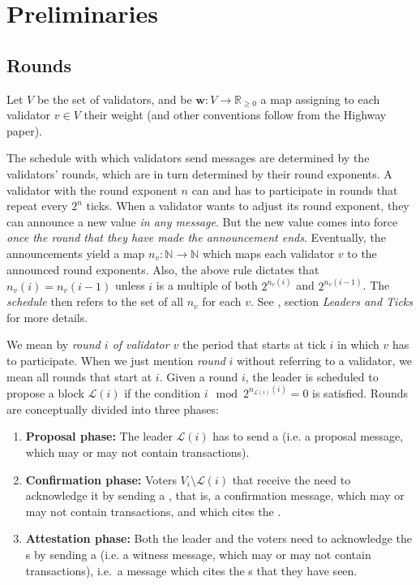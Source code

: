\section{Preliminaries}

\subsection{Rounds}
\label{sec:schedule}

Let $V$ be the set of validators, and be $\boldsymbol{w}:V\to \mathbb{R}_{\geq 0}$ a map assigning to each validator $v\in V$ their weight (and other conventions follow from the Highway paper).

The schedule with which validators send messages are determined by the validators' rounds, which are in turn determined by their round exponents. A validator with the round exponent $n$ can and has to participate in rounds that repeat every $2^n$ ticks. When a validator wants to adjust its round exponent, they can announce a new value \emph{in any message}. But the new value comes into force \emph{once the round that they have made the announcement ends}. Eventually, the announcements yield a map $n_v: \mathbb{N}\to \mathbb{N}$ which maps each validator $v$ to the announced round exponents. Also, the above rule dictates that $n_v(i)=n_v(i-1)$ unless $i$ is a multiple of both $2^{n_v(i)}$ and $2^{n_v(i-1)}$. The \emph{schedule} then refers to the set of all $n_v$ for each $v$. See \cite{kane2019casperlabs}, section \emph{Leaders and Ticks} for more details.

We mean by \emph{round $i$ of validator $v$} the period that starts at tick $i$ in which $v$ has to participate. When we just mention \emph{round} $i$ without referring to a validator, we mean all rounds that start at $i$. Given a round $i$, the leader is scheduled to propose a block $\mathcal{L}(i)$ if the condition $i\mod 2^{n_{\mathcal{L}(i)}(i)}=0$ is satisfied. Rounds are conceptually divided into three phases:

\begin{enumerate}
\item \textbf{Proposal phase:}
  The leader $\mathcal{L}(i)$ has to send a \PROP{} (i.e. a proposal message, which may or may not contain transactions).
\item \textbf{Confirmation phase:}
  Voters $V_i\setminus \mathcal{L}(i)$ that receive the \PROP need to acknowledge it by sending a \CONF, that is, a confirmation message, which may or may not contain transactions, and which cites the \PROP.
\item \textbf{Attestation phase:}
  Both the leader and the voters need to acknowledge the \CONF{}s by sending a \WIT{} (i.e. a witness message, which may or may not contain transactions), i.e.~a message which cites the \CONF{}s that they have seen.
\end{enumerate}

